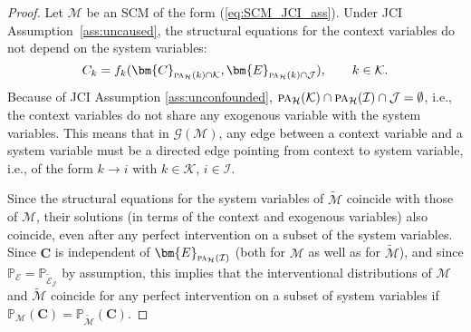 \documentclass[twoside,11pt]{article}
\newenvironment{customthm}[1]
  {\renewcommand\theinnercustomthm{#1}\innercustomthm}
  {\endinnercustomthm}
\newcommand{\Prb}{\mathbb{P}}
\newcommand\B[1]{\bm{#1}}
\newcommand\C[1]{\mathcal{#1}}
\newcommand\mathbfsc[1]{\text{\normalfont\scshape#1}}
\newcommand\desub[2]{\mathbfsc{de}_{#1}(#2)}
\newcommand\sccsub[2]{\mathbfsc{sc}_{#1}(#2)}
\newcommand\pasub[2]{\mathbfsc{pa}_{#1}(#2)}
\newcommand\given{\,|\,}
\newcommand\eref[1]{(\ref{#1})}
\newcommand{\intervene}{\mathrm{do}}
\newcommand{\Joris}[1]{{\color{blue}#1}}
\begin{document}
\begin{customthm}{\ref{thm:replace_context}}
\cmdTheoremReplaceContext
\end{customthm}
\begin{proof}
Let $\C{M}$ be an SCM of the form \eref{eq:SCM_JCI_ass}. Under JCI Assumption~\ref{ass:uncaused}, the structural equations for the context variables do not depend on the system variables:
$$C_k = f_k(\B{C}_{\pasub{\C{H}}{k} \cap \C{K}}, \B{E}_{\pasub{\C{H}}{k} \cap \C{J}}), \qquad k \in \C{K}.$$
Because of JCI Assumption \ref{ass:unconfounded}, $\pasub{\C{H}}{\C{K}} \cap \pasub{\C{H}}{\C{I}} \cap \C{J} = \emptyset$, i.e., the context variables do not share any exogenous variable with the system variables.
This means that in $\C{G}(\C{M})$, any edge between a context variable and a system variable must be a directed edge pointing
from context to system variable, i.e., of the form $k \to i$ with $k \in \C{K}$, $i \in \C{I}$.

Since the structural equations for the system variables of $\tilde{\C{M}}$ coincide with
those of $\C{M}$, their solutions (in terms of the context and exogenous variables) also
coincide, even after any perfect intervention on a subset of the system variables.
Since $\B{C}$ is independent of $\B{E}_{\pasub{\C{H}}{\C{I}}}$ (both for $\C{M}$ as well as for $\tilde{\C{M}}$),
and since $\Prb_{\C{E}} = \Prb_{\tilde{\C{E}}_{\C{J}}}$ by assumption,
this implies that the interventional distributions of $\C{M}$ and $\tilde{\C{M}}$ coincide
for any perfect intervention on a subset of system variables if $\Prb_{\C{M}}(\B{C}) = \Prb_{\tilde{\C{M}}}(\B{C})$.




\end{proof}
\end{document}
